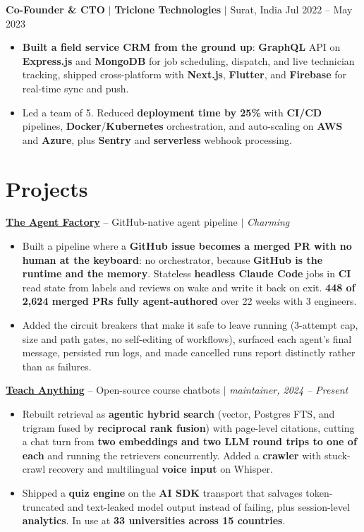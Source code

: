 \documentclass[10pt,a4paper]{article}
\begin{document}
\vspace{1pt}
\textbf{Co-Founder \& CTO} $|$ \textbf{Triclone Technologies} $|$ Surat, India \hfill Jul 2022 -- May 2023
\begin{itemize}
    \item \textbf{Built a field service CRM from the ground up}: \textbf{GraphQL} API on \textbf{Express.js} and \textbf{MongoDB} for job scheduling, dispatch, and live technician tracking, shipped cross-platform with \textbf{Next.js}, \textbf{Flutter}, and \textbf{Firebase} for real-time sync and push.
    \item Led a team of 5. Reduced \textbf{deployment time by 25\%} with \textbf{CI/CD} pipelines, \textbf{Docker}/\textbf{Kubernetes} orchestration, and auto-scaling on \textbf{AWS} and \textbf{Azure}, plus \textbf{Sentry} and \textbf{serverless} webhook processing.
\end{itemize}

\section{Projects}

\textbf{\href{https://charm.ing/avi/the-agent-factory-slides}{The Agent Factory}} -- GitHub-native agent pipeline $|$ \textit{Charming}
\begin{itemize}
    \item Built a pipeline where a \textbf{GitHub issue becomes a merged PR with no human at the keyboard}: no orchestrator, because \textbf{GitHub is the runtime and the memory}. Stateless \textbf{headless Claude Code} jobs in \textbf{CI} read state from labels and reviews on wake and write it back on exit. \textbf{448 of 2,624 merged PRs fully agent-authored} over 22 weeks with 3 engineers.
    \item Added the circuit breakers that make it safe to leave running (3-attempt cap, size and path gates, no self-editing of workflows), surfaced each agent's final message, persisted run logs, and made cancelled runs report distinctly rather than as failures.
\end{itemize}

\textbf{\href{https://github.com/akhileshrangani4/teachanything}{Teach Anything}} -- Open-source course chatbots $|$ \textit{maintainer, 2024 -- Present}
\begin{itemize}
    \item Rebuilt retrieval as \textbf{agentic hybrid search} (vector, Postgres FTS, and trigram fused by \textbf{reciprocal rank fusion}) with page-level citations, cutting a chat turn from \textbf{two embeddings and two LLM round trips to one of each} and running the retrievers concurrently. Added a \textbf{crawler} with stuck-crawl recovery and multilingual \textbf{voice input} on Whisper.
    \item Shipped a \textbf{quiz engine} on the \textbf{AI SDK} transport that salvages token-truncated and text-leaked model output instead of failing, plus session-level \textbf{analytics}. In use at \textbf{33 universities across 15 countries}.
\end{itemize}
\end{document}
